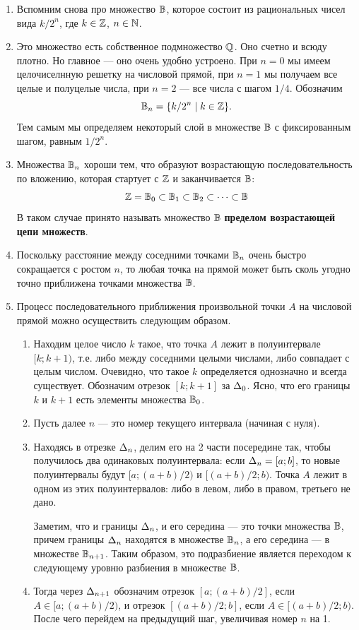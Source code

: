 \begin{enumerate}
\item Вспомним снова про множество $\mathbb B$, которое состоит из рациональных чисел вида $k/2^n$, где $k\in\mathbb Z$, $n\in\mathbb N$.
\item Это множество есть собственное подмножество $\mathbb Q$. Оно счетно и всюду плотно. Но главное --- оно очень удобно устроено.
При $n=0$ мы имеем целочиселнную решетку на числовой прямой, при $n=1$ мы получаем все целые и полуцелые числа, при $n=2$ --- все числа с шагом $1/4$. Обозначим
$$
\mathbb B_n=\{k/2^n\mid k\in\mathbb Z\}.
$$
Тем самым мы определяем некоторый слой в множестве $\mathbb B$ с фиксированным шагом, равным $1/2^n$.
\item Множества $\mathbb B_n$ хороши тем, что образуют возрастающую последовательность по вложению, которая стартует с $\mathbb Z$ и заканчивается $\mathbb B$:
$$
\mathbb Z=\mathbb B_0\subset\mathbb B_1\subset\mathbb B_2\subset\dots\subset\mathbb B
$$
В таком случае принято называть множество $\mathbb B$ \textbf{пределом возрастающей цепи множеств}.
\item Поскольку расстояние между соседними точками $\mathbb B_n$ очень быстро сокращается с ростом $n$, то любая точка на прямой может быть сколь угодно точно приближена точками множества $\mathbb B$.
\item Процесс последовательного приближения произвольной точки $A$ на числовой прямой можно осуществить следующим образом.
\begin{enumerate}[{\bf Step1}]
\item Находим целое число $k$ такое, что точка $A$ лежит в полуинтервале $[k;k+1)$, т.е. либо между соседними целыми числами, либо совпадает с целым числом. Очевидно, что такое $k$ определяется однозначно и всегда существует. Обозначим отрезок $[k;k+1]$ за $\Delta_0$. Ясно, что его границы $k$ и $k+1$ есть элементы множества $\mathbb B_0$.
\item Пусть далее $n$ --- это номер текущего интервала (начиная с нуля).
\item Находясь в отрезке $\Delta_n$, делим его на 2 части посередине так, чтобы получилось два одинаковых полуинтервала: если $\Delta_n=[a;b]$, то новые полуинтервалы будут $[a;(a+b)/2)$ и $[(a+b)/2;b)$. Точка $A$ лежит в одном из этих полуинтервалов: либо в левом, либо в правом, третьего не дано.

Заметим, что и границы $\Delta_n$, и его середина --- это точки множества $\mathbb B$, причем границы $\Delta_n$ находятся в множестве $\mathbb B_n$, а его середина --- в множестве $\mathbb B_{n+1}$. Таким образом, это подразбиение является переходом к следующему уровню разбиения в множестве $\mathbb B$.
\item Тогда через $\Delta_{n+1}$ обозначим отрезок $[a;(a+b)/2]$, если $A\in[a;(a+b)/2)$, и отрезок $[(a+b)/2;b]$, если $A\in[(a+b)/2;b)$. После чего перейдем на предыдущий шаг, увеличивая номер $n$ на 1.
\end{enumerate}


\end{enumerate}
